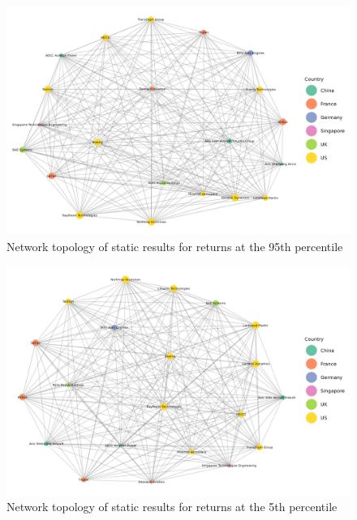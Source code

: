\documentclass[
  number]{elsarticle}
\begin{document}
\begin{figure}[H]

{\centering \includegraphics[width=6.75in,height=\textheight]{plots/fig-rtn95.png}

}

\caption{\label{fig-rtn95}Network topology of static results for returns
at the 95th percentile}

\end{figure}

\begin{figure}[H]

{\centering \includegraphics[width=6.75in,height=\textheight]{plots/fig-rtn5.png}

}

\caption{\label{fig-rtn5}Network topology of static results for returns
at the 5th percentile}

\end{figure}
\end{document}
